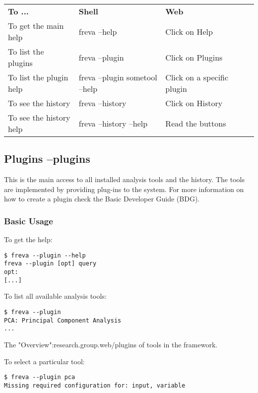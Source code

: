 \documentclass[a4paper,11pt]{ltxdoc}
\begin{document}
\begin{tabular}{lllll}
\cline{1-1}
\multicolumn{1}{|l|}{\textbf{To ... } }  & \multicolumn{1}{|l|}{\textbf{Shell}} & \multicolumn{1}{|l|}{\textbf{Web}} \\ 
\multicolumn{1}{|l|}{To get the main help }  & \multicolumn{1}{|l|}{freva --help} & \multicolumn{1}{|l|}{Click on Help} \\ 
\multicolumn{1}{|l|}{To list the plugins }  & \multicolumn{1}{|l|}{freva --plugin} &  \multicolumn{1}{|l|}{Click on Plugins} \\
\multicolumn{1}{|l|}{To list the plugin help }  & \multicolumn{1}{|l|}{freva --plugin sometool --help} &  \multicolumn{1}{|l|}{Click on a specific plugin} \\
\multicolumn{1}{|l|}{To see the history }  & \multicolumn{1}{|l|}{freva --history} &  \multicolumn{1}{|l|}{Click on History} \\
\multicolumn{1}{|l|}{To see the history help }  & \multicolumn{1}{|l|}{freva --history --help} &  \multicolumn{1}{|l|}{Read the buttons} \\
\end{tabular}


\subsection{Plugins --plugins}

This is the main access to all installed analysis tools and the history. The tools are implemented by providing plug-ins to the system. For more information on how to create a plugin check the Basic Developer Guide (BDG). 

\subsubsection*{Basic Usage}

To get the help:
\begin{lstlisting} 
$ freva --plugin --help
freva --plugin [opt] query 
opt:
[...]
\end{lstlisting}
To list all available analysis tools:
\begin{lstlisting} 
$ freva --plugin
PCA: Principal Component Analysis
...
\end{lstlisting}
The "Overview":research.group.web/plugins of tools in the framework.

To select a particular tool:
\begin{lstlisting}
$ freva --plugin pca
Missing required configuration for: input, variable
\end{lstlisting}
\end{document}
